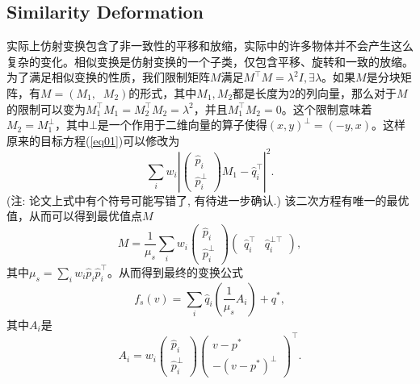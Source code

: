 \documentclass[12pt]{article}
\begin{document}
\subsection{Similarity Deformation}
实际上仿射变换包含了非一致性的平移和放缩，实际中的许多物体并不会产生这么复杂的变化。相似变换是仿射变换的一个子类，仅包含平移、旋转和一致的放缩。为了满足相似变换的性质，我们限制矩阵$M$满足$M^{\top}M=\lambda^2I, \exists\lambda$。如果$M$是分块矩阵，有$M=(M_1,\;\;M_2)$的形式，其中$M_1, M_2$都是长度为$2$的列向量，那么对于$M$的限制可以变为$M_1^{\top}M_1=M_2^{\top}M_2=\lambda^2$，并且$M_1^{\top}M_2=0$。这个限制意味着$M_2=M_1^{\bot}$，其中$\bot$是一个作用于二维向量的算子使得$(x, y)^{\bot}=(-y, x)$。这样原来的目标方程(\ref{eq01})可以修改为
\begin{equation}
	\sum_i w_i\left|\left(\begin{matrix}
	\hat{p}_i \\ \hat{p}_i^{\bot}
	\end{matrix}\right)M_1-\hat{q}_i^{\top}\right|^2.
\end{equation}
(注: 论文上式中有个符号可能写错了, 有待进一步确认.) 
该二次方程有唯一的最优值，从而可以得到最优值点$M$
\begin{equation}\label{eq02}
	M = \frac{1}{\mu_s}\sum_i w_i\left(\begin{matrix}
	\hat{p}_i \\ \hat{p}_i^{\bot}
	\end{matrix}\right)\left(\begin{matrix}
	\hat{q}_i^{\top} & \hat{q}_i^{\bot\top}
	\end{matrix}\right),
\end{equation}
其中$\mu_s=\sum_i w_i\hat{p}_i\hat{p}_i^{\top}$。从而得到最终的变换公式
\begin{equation*}
	f_s(v) = \sum_i\hat{q}_i\left(\frac{1}{\mu_s}A_i\right)+q^*,
\end{equation*}
其中$A_i$是
\begin{equation}\label{eq03}
	A_i = w_i\left(\begin{matrix}
	\hat{p}_i \\ \hat{p}_i^{\bot}
	\end{matrix}\right)\left(\begin{matrix}
	v-p^* \\ -(v-p^*)^{\bot}
	\end{matrix}\right)^{\top}.
\end{equation}
\end{document}
